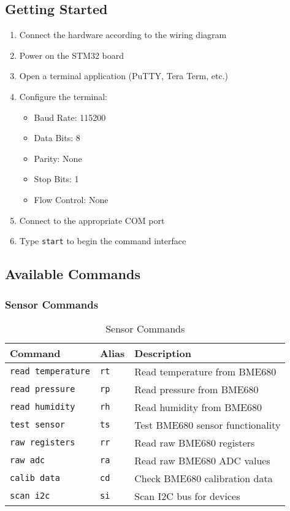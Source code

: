 \documentclass[11pt,a4paper]{article}
\newcommand{\command}[1]{\texttt{#1}}
\begin{document}
\subsection{Getting Started}
\begin{enumerate}
    \item Connect the hardware according to the wiring diagram
    \item Power on the STM32 board
    \item Open a terminal application (PuTTY, Tera Term, etc.)
    \item Configure the terminal:
        \begin{itemize}
            \item Baud Rate: 115200
            \item Data Bits: 8
            \item Parity: None
            \item Stop Bits: 1
            \item Flow Control: None
        \end{itemize}
    \item Connect to the appropriate COM port
    \item Type \command{start} to begin the command interface
\end{enumerate}

\subsection{Available Commands}

\subsubsection{Sensor Commands}
\begin{table}[h]
\centering
\begin{tabular}{|l|l|l|}
\hline
\textbf{Command} & \textbf{Alias} & \textbf{Description} \\
\hline
\texttt{read temperature} & \texttt{rt} & Read temperature from BME680 \\
\hline
\texttt{read pressure} & \texttt{rp} & Read pressure from BME680 \\
\hline
\texttt{read humidity} & \texttt{rh} & Read humidity from BME680 \\
\hline
\texttt{test sensor} & \texttt{ts} & Test BME680 sensor functionality \\
\hline
\texttt{raw registers} & \texttt{rr} & Read raw BME680 registers \\
\hline
\texttt{raw adc} & \texttt{ra} & Read raw BME680 ADC values \\
\hline
\texttt{calib data} & \texttt{cd} & Check BME680 calibration data \\
\hline
\texttt{scan i2c} & \texttt{si} & Scan I2C bus for devices \\
\hline
\end{tabular}
\caption{Sensor Commands}
\end{table}
\end{document}
